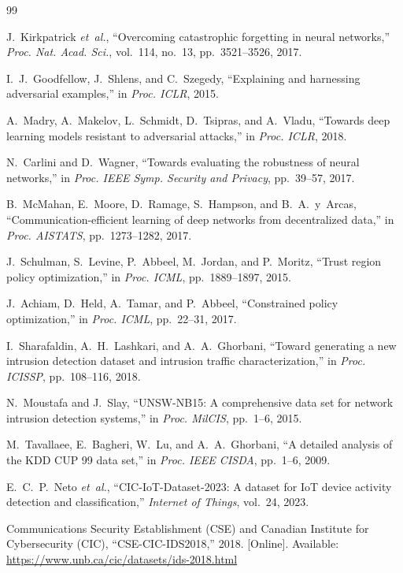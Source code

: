 \documentclass[journal,twoside]{IEEEtran}
\begin{document}
\begin{thebibliography}{99}

J.~Kirkpatrick \emph{et~al.}, ``Overcoming catastrophic forgetting in neural networks,'' \emph{Proc. Nat. Acad. Sci.}, vol.~114, no.~13, pp.~3521--3526, 2017.

I.~J.~Goodfellow, J.~Shlens, and C.~Szegedy, ``Explaining and harnessing adversarial examples,'' in \emph{Proc. ICLR}, 2015.

A.~Madry, A.~Makelov, L.~Schmidt, D.~Tsipras, and A.~Vladu, ``Towards deep learning models resistant to adversarial attacks,'' in \emph{Proc. ICLR}, 2018.

N.~Carlini and D.~Wagner, ``Towards evaluating the robustness of neural networks,'' in \emph{Proc. IEEE Symp. Security and Privacy}, pp.~39--57, 2017.

B.~McMahan, E.~Moore, D.~Ramage, S.~Hampson, and B.~A.~y~Arcas, ``Communication-efficient learning of deep networks from decentralized data,'' in \emph{Proc. AISTATS}, pp.~1273--1282, 2017.

J.~Schulman, S.~Levine, P.~Abbeel, M.~Jordan, and P.~Moritz, ``Trust region policy optimization,'' in \emph{Proc. ICML}, pp.~1889--1897, 2015.

J.~Achiam, D.~Held, A.~Tamar, and P.~Abbeel, ``Constrained policy optimization,'' in \emph{Proc. ICML}, pp.~22--31, 2017.

I.~Sharafaldin, A.~H.~Lashkari, and A.~A.~Ghorbani, ``Toward generating a new intrusion detection dataset and intrusion traffic characterization,'' in \emph{Proc. ICISSP}, pp.~108--116, 2018.

N.~Moustafa and J.~Slay, ``UNSW-NB15: A comprehensive data set for network intrusion detection systems,'' in \emph{Proc. MilCIS}, pp.~1--6, 2015.

M.~Tavallaee, E.~Bagheri, W.~Lu, and A.~A.~Ghorbani, ``A detailed analysis of the KDD CUP 99 data set,'' in \emph{Proc. IEEE CISDA}, pp.~1--6, 2009.

E.~C.~P.~Neto \emph{et~al.}, ``CIC-IoT-Dataset-2023: A dataset for IoT device activity detection and classification,'' \emph{Internet of Things}, vol.~24, 2023.

Communications Security Establishment (CSE) and Canadian Institute for Cybersecurity (CIC), ``CSE-CIC-IDS2018,'' 2018. [Online]. Available: \url{https://www.unb.ca/cic/datasets/ids-2018.html}


\end{thebibliography}
\end{document}
